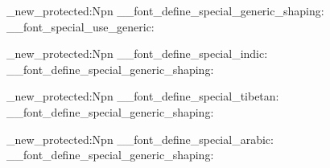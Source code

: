 
\ExplSyntaxOn

\cs_new_protected:Npn \__font_define_special_generic_shaping:
  {
    \__font_special_use_generic:
  }

\cs_new_protected:Npn \__font_define_special_indic:
  {
    \__font_define_special_generic_shaping:
  }

\cs_new_protected:Npn \__font_define_special_tibetan:
  {
    \__font_define_special_generic_shaping:
  }

\cs_new_protected:Npn \__font_define_special_arabic:
  {
    \__font_define_special_generic_shaping:
  }

\ExplSyntaxOff
